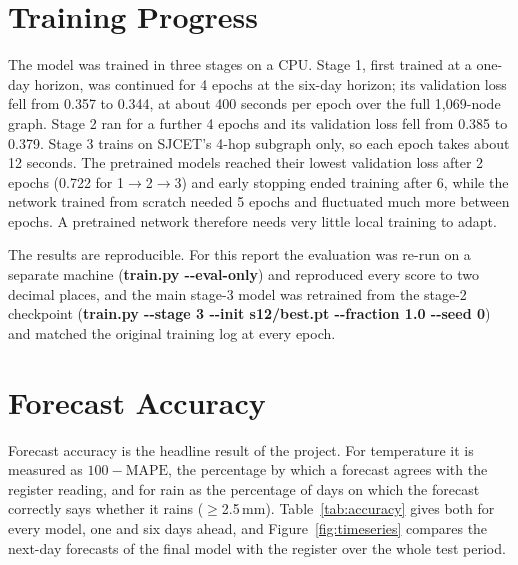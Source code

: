 \section{Training Progress}
\label{sec:res-training}

The model was trained in three stages on a CPU. Stage 1, first trained at a one-day horizon, was continued for 4 epochs at the six-day horizon; its validation loss fell from 0.357 to 0.344, at about 400 seconds per epoch over the full 1,069-node graph. Stage 2 ran for a further 4 epochs and its validation loss fell from 0.385 to 0.379. Stage 3 trains on SJCET's 4-hop subgraph only, so each epoch takes about 12 seconds. The pretrained models reached their lowest validation loss after 2 epochs (0.722 for 1$\to$\allowbreak{}2$\to$\allowbreak{}3) and early stopping ended training after 6, while the network trained from scratch needed 5 epochs and fluctuated much more between epochs. A pretrained network therefore needs very little local training to adapt.

The results are reproducible. For this report the evaluation was re-run on a separate machine (\textbf{train.py -{}-eval-only}) and reproduced every score to two decimal places, and the main stage-3 model was retrained from the stage-2 checkpoint (\textbf{train.py -{}-stage 3 -{}-init s12/\allowbreak{}best.pt -{}-fraction 1.0 -{}-seed 0}) and matched the original training log at every epoch.

\section{Forecast Accuracy}
\label{sec:res-accuracy}

Forecast accuracy is the headline result of the project. For temperature it is measured as $100-\mathrm{MAPE}$, the percentage by which a forecast agrees with the register reading, and for rain as the percentage of days on which the forecast correctly says whether it rains ($\geq$2.5\,mm). Table~\ref{tab:accuracy} gives both for every model, one and six days ahead, and Figure~\ref{fig:timeseries} compares the next-day forecasts of the final model with the register over the whole test period.

